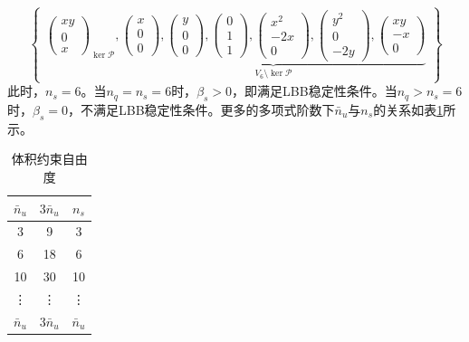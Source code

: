 \begin{equation}
\begin{Bmatrix}
{        \begin{pmatrix} xy  \\ 0 \\ x \end{pmatrix}
        }_{\ker \mathcal P},
        \underbrace{
        \begin{pmatrix} x \\ 0 \\ 0 \end{pmatrix},
        \begin{pmatrix} y \\ 0 \\ 0 \end{pmatrix},
        \begin{pmatrix} 0 \\ 1 \\ 1 \end{pmatrix},
        \begin{pmatrix} x^2 \\ -2x \\ 0 \end{pmatrix},
        \begin{pmatrix} y^2 \\ 0 \\ -2y \end{pmatrix},
        \begin{pmatrix} xy \\ -x \\ 0 \end{pmatrix}
        }_{V_6\setminus \ker \mathcal P}
    \end{Bmatrix}
\end{equation}
此时，$n_s=6$。当$n_q=n_s=6$时，$\beta_s>0$，即满足LBB稳定性条件。当$n_q>n_s=6$时，$\beta_s=0$，不满足LBB稳定性条件。更多的多项式阶数下$\bar{n}_u$与$n_s$的关系如表\ref{ch_5:tab:constraint}所示。
\begin{table}[!h]
    \centering
    \caption{体积约束自由度}\label{ch_5:tab:constraint}
    \setlength{\tabcolsep}{10mm}
    \renewcommand{\arraystretch}{1.2}
    \begin{tabular}{ccc}
        \toprule
            $\bar{n}_u$ & $3\bar{n}_u$ &$ n_s$\\
        \midrule
        3  & 9  &  3 \\
        6  & 18 &  6 \\
        10 & 30 &  10 \\
        \vdots & \vdots & \vdots \\
        $\bar{n}_u$ & $3\bar{n}_u$ & $\bar{n}_u$ \\
        \bottomrule
    \end{tabular}
\end{table}

